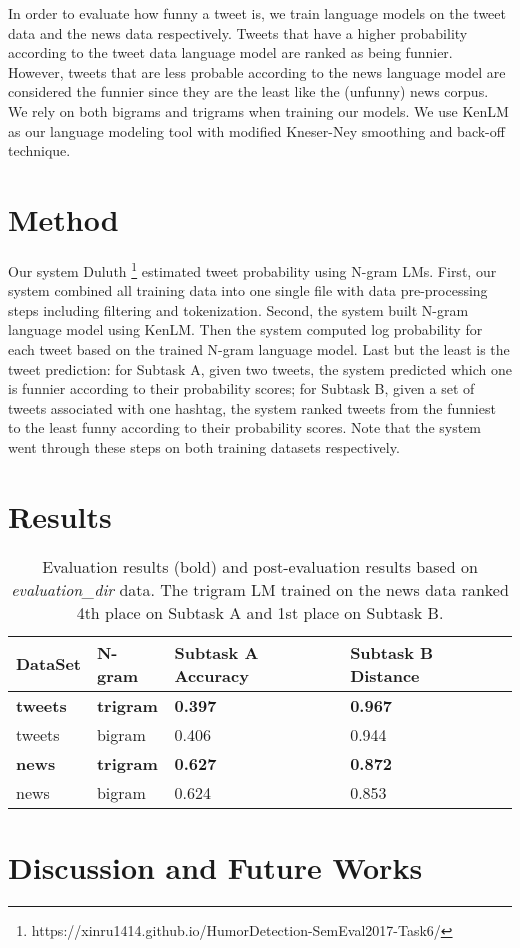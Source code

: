 \documentclass[11pt,a4paper]{article}
\begin{document}
In order to evaluate how funny a tweet is, we train language models on the tweet data and the news data respectively. Tweets that have a higher probability according to the tweet data language model 
are ranked as being funnier. However, tweets that are less probable according to the news language 
model are considered the funnier since they are the least like the (unfunny) news corpus. We rely on both bigrams and trigrams when training our models. We use KenLM \cite{Heafield-estimate} as our language modeling tool with modified Kneser-Ney smoothing and back-off technique.

\section{Method}
Our system Duluth \footnote{https://xinru1414.github.io/HumorDetection-SemEval2017-Task6/} estimated tweet probability using N-gram LMs. First, our system combined all training data into one single file with data pre-processing steps including filtering and tokenization. Second, the system built N-gram language model using KenLM. Then the system computed log probability for each tweet based on the trained N-gram language model. Last but the least is the tweet prediction: for Subtask A, given two tweets, the system predicted which one is funnier according to their probability scores; for Subtask B, given a set of tweets associated with one hashtag, the system ranked tweets from the funniest to the least funny according to their probability scores. 
Note that the system went through these steps on both training datasets respectively.

\section{Results}

\begin{table}[h]
\begin{center}
\begin{tabular}{ |p{1.2cm}|p{1.2cm}|p{1.7cm}|p{1.7cm}|}
\hline
DataSet & N-gram & Subtask A Accuracy & Subtask B Distance \\
\hline
\textbf{tweets} & \textbf{trigram} & \textbf{0.397} & \textbf{0.967} \\
\hline
tweets & bigram & 0.406 & 0.944 \\
\hline
\textbf{news} & \textbf{trigram} & \textbf{0.627} & \textbf{0.872} \\
\hline
news & bigram & 0.624 & 0.853 \\
\hline
\end{tabular}
\caption{Evaluation results (bold) and post-evaluation results based on \textit{evaluation\_dir} data. The trigram LM trained on the news data ranked 4th place on Subtask A and 1st place on Subtask B.}
\end{center}
\end{table}

\section{Discussion and Future Works}



%
%


\end{document}
